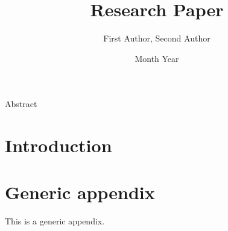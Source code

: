 \documentclass[letterpaper,11pt,leqno]{article}
\begin{document}
\title{Research Paper}

\author{First Author, Second Author
%
}

\date{Month Year}

\maketitle

Abstract


\section{Introduction}\label{s:introduction}

\appendix

\section{Generic appendix}\label{a:appendix1}

This is a generic appendix.
\end{document}
